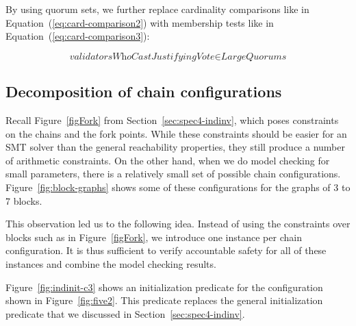 By using quorum sets, we further replace cardinality comparisons like in
Equation~(\ref{eq:card-comparison2}) with membership tests like in
Equation~(\ref{eq:card-comparison3}):

\begin{equation}
    \textit{validatorsWhoCastJustifyingVote} \in \textit{LargeQuorums}
    \label{eq:card-comparison3}
\end{equation}


\subsection{Decomposition of chain configurations}\label{sec:decomposition}

Recall Figure~\ref{figFork} from Section~\ref{sec:spec4-indinv}, which poses
constraints on the chains and the fork points. While these constraints should
be easier for an SMT solver than the general reachability properties, they
still produce a number of arithmetic constraints. On the other hand, when we do
model checking for small parameters, there is a relatively small set of
possible chain configurations.  Figure~\ref{fig:block-graphs} shows some of
these configurations for the graphs of 3 to 7 blocks.

This observation led us to the following idea. Instead of using the constraints
over blocks such as in Figure~\ref{figFork}, we introduce one instance per
chain configuration. It is thus sufficient to verify accountable safety for all
of these instances and combine the model checking results.

Figure~\ref{fig:indinit-c3} shows an initialization predicate for the
configuration shown in Figure~\ref{fig:five2}. This predicate replaces the
general initialization predicate that we discussed in
Section~\ref{sec:spec4-indinv}.

